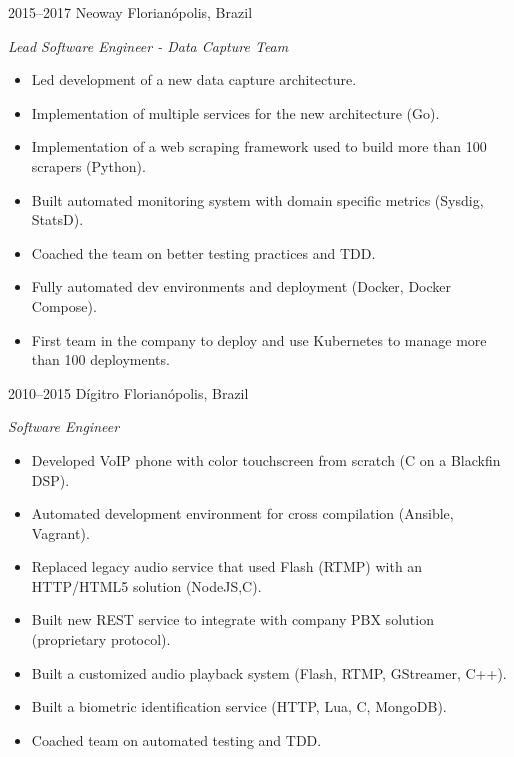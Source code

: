 \documentclass[]{friggeri-cv} %
\begin{document}
\begin{entrylist}
\entry
{2015--2017}
{Neoway}
{Florianópolis, Brazil}
{\emph{Lead Software Engineer - Data Capture Team} \\

\begin{itemize}
  \item Led development of a new data capture architecture.
  \item Implementation of multiple services for the new architecture (Go).
  \item Implementation of a web scraping framework used to build more than 100 scrapers (Python).
  \item Built automated monitoring system with domain specific metrics (Sysdig, StatsD).
  \item Coached the team on better testing practices and TDD.
  \item Fully automated dev environments and deployment (Docker, Docker Compose).
  \item First team in the company to deploy and use Kubernetes to manage more than 100 deployments.
\end{itemize}
}
\end{entrylist}

\begin{entrylist}
\entry
{2010--2015}
{Dígitro}
{Florianópolis, Brazil}
{\emph{Software Engineer} \\

\begin{itemize}
  \item Developed VoIP phone with color touchscreen from scratch (C on a Blackfin DSP).
  \item Automated development environment for cross compilation (Ansible, Vagrant).
  \item Replaced legacy audio service that used Flash (RTMP) with an HTTP/HTML5 solution (NodeJS,C).
  \item Built new REST service to integrate with company PBX solution (proprietary protocol).
  \item Built a customized audio playback system (Flash, RTMP, GStreamer, C++).
  \item Built a biometric identification service (HTTP, Lua, C, MongoDB).
  \item Coached team on automated testing and TDD.
\end{itemize}
}
\end{entrylist}
\end{document}
